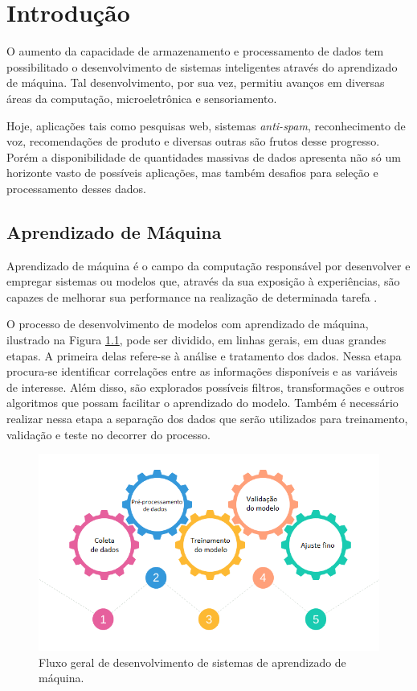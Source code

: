 \chapter[Introdução]{Introdução}

O aumento da capacidade de armazenamento e processamento de dados tem possibilitado o desenvolvimento de sistemas inteligentes através do aprendizado de máquina. Tal desenvolvimento, por sua vez, permitiu avanços em diversas áreas da computação, microeletrônica e sensoriamento. 

Hoje, aplicações tais como pesquisas web, sistemas \textit{anti-spam}, reconhecimento de voz, recomendações de produto e diversas outras são frutos desse progresso. Porém a disponibilidade de quantidades massivas de dados apresenta não só um horizonte vasto de possíveis aplicações, mas também desafios para seleção e processamento desses dados.


\section{Aprendizado de Máquina}

Aprendizado de máquina é o campo da computação responsável por desenvolver e empregar sistemas ou modelos que, através da sua exposição à experiências, são capazes de melhorar sua performance na realização de determinada tarefa \cite{mitchell_1997}.

O processo de desenvolvimento de modelos com aprendizado de máquina, ilustrado na Figura \ref{fig:mlflow}, pode ser dividido, em linhas gerais, em duas grandes etapas. A primeira delas refere-se à análise e tratamento dos dados. Nessa etapa procura-se identificar correlações entre as informações disponíveis e as variáveis de interesse. Além disso, são explorados possíveis filtros, transformações e outros algoritmos que possam facilitar o aprendizado do modelo. Também é necessário realizar nessa etapa a separação dos dados que serão utilizados para treinamento, validação e teste no decorrer do processo.

\begin{figure}[!htb]
    \caption{Fluxo geral de desenvolvimento de sistemas de aprendizado de máquina.}
    \begin{center}
    \includegraphics[width=\linewidth]{imgs/intro/MLFlow}
    \end{center}
    \label{fig:mlflow}
\end{figure}

